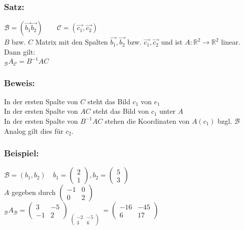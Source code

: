 \subsubsection{Satz:}
$\mathcal{B} = (\vec{b_{1}} \vec{b_{2}}) \qquad \mathcal{C} = (\vec{c_{1}}, \vec{c_{2}})$\\
$B$ bzw. $C$ Matrix mit den Spalten $\vec{b_{1}}, \vec{b_{2}}$ bzw. $\vec{c_{1}}, \vec{c_{2}}$ und ist $A: \mathbb{R}^{2} \rightarrow \mathbb{R}^{2}$ linear. Dann gilt:\\
$_{\mathcal{B}}A_{\mathcal{C}}=B^{-1}AC$\\
%
%
%
\subsubsection{Beweis:}
In der ersten Spalte von $C$ steht das Bild $c_{1}$ von $e_{1}$\\
In der ersten Spalte von $AC$ steht das Bild von $c_{1}$ unter $A$\\
In der ersten Spalte von $B^{-1}AC$ stehen die Koordinaten von $A(c_{1})$ bzgl. $\mathcal{B}$ Analog gilt dies für $c_{2}$.
%
%
%
\subsubsection{Beispiel:}
$\mathcal{B}=(b_{1},b_{2}) \quad b_{1}=\begin{pmatrix} 2 \\ 1 \end{pmatrix}, b_{2}=\begin{pmatrix}5 \\ 3\end{pmatrix}$\\
$A$ gegeben durch $\begin{pmatrix} -1 & 0 \\ 0 & 2 \end{pmatrix}$\\
$_{\mathcal{B}}A_{\mathcal{B}}=\begin{pmatrix} 3 & -5 \\ -1 & 2 \end{pmatrix} \mathop{\underbrace{\begin{pmatrix} -1 & 0 \\ 0 & 2\end{pmatrix} \begin{pmatrix}2 & 5 \\ 1 & 3 \end{pmatrix}}}\limits_{\begin{pmatrix}-2 & -5 \\ 3 & 6 \end{pmatrix}}= \begin{pmatrix} -16 & -45 \\ 6 & 17\end{pmatrix}$
%
%
%
